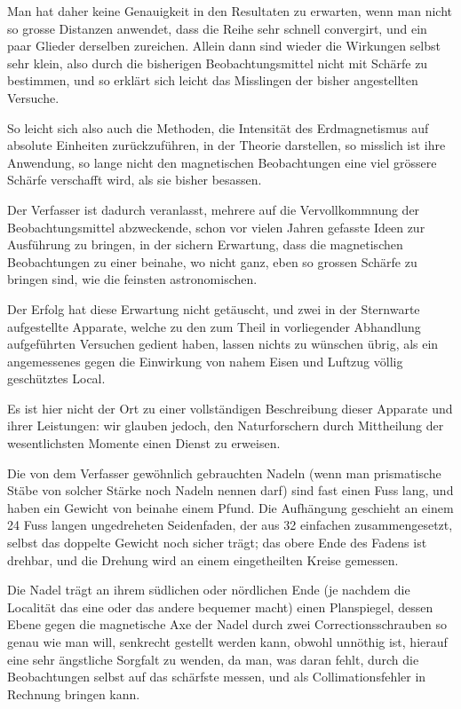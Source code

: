\documentclass[12pt,a4paper]{article}
\begin{document}
Man hat daher keine Genauigkeit in den Resultaten zu erwarten, wenn man nicht so grosse Distanzen anwendet, dass die Reihe sehr schnell convergirt, und ein paar Glieder derselben zureichen. Allein dann sind wieder die Wirkungen selbst sehr klein, also durch die bisherigen Beobachtungsmittel nicht mit Schärfe zu bestimmen, und so erklärt sich leicht das Misslingen der bisher angestellten Versuche.

So leicht sich also auch die Methoden, die Intensität des Erdmagnetismus auf absolute Einheiten zurückzuführen, in der Theorie darstellen, so misslich ist ihre Anwendung, so lange nicht den magnetischen Beobachtungen eine viel grössere Schärfe verschafft wird, als sie bisher besassen.

Der Verfasser ist dadurch veranlasst, mehrere auf die Vervollkommnung der Beobachtungsmittel abzweckende, schon vor vielen Jahren gefasste Ideen zur Ausführung zu bringen, in der sichern Erwartung, dass die magnetischen Beobachtungen zu einer beinahe, wo nicht ganz, eben so grossen Schärfe zu bringen sind, wie die feinsten astronomischen.

Der Erfolg hat diese Erwartung nicht getäuscht, und zwei in der Sternwarte aufgestellte Apparate, welche zu den zum Theil in vorliegender Abhandlung aufgeführten Versuchen gedient haben, lassen nichts zu wünschen übrig, als ein angemessenes gegen die Einwirkung von nahem Eisen und Luftzug völlig geschütztes Local.

Es ist hier nicht der Ort zu einer vollständigen Beschreibung dieser Apparate und ihrer Leistungen: wir glauben jedoch, den Naturforschern durch Mittheilung der wesentlichsten Momente einen Dienst zu erweisen.

Die von dem Verfasser gewöhnlich gebrauchten Nadeln (wenn man prismatische Stäbe von solcher Stärke noch Nadeln nennen darf) sind fast einen Fuss lang, und haben ein Gewicht von beinahe einem Pfund. Die Aufhängung geschieht an einem 24 Fuss langen ungedreheten Seidenfaden, der aus 32 einfachen zusammengesetzt, selbst das doppelte Gewicht noch sicher trägt; das obere Ende des Fadens ist drehbar, und die Drehung wird an einem eingetheilten Kreise gemessen.

Die Nadel trägt an ihrem südlichen oder nördlichen Ende (je nachdem die Localität das eine oder das andere bequemer macht) einen Planspiegel, dessen Ebene gegen die magnetische Axe der Nadel durch zwei Correctionsschrauben so genau wie man will, senkrecht gestellt werden kann, obwohl unnöthig ist, hierauf eine sehr ängstliche Sorgfalt zu wenden, da man, was daran fehlt, durch die Beobachtungen selbst auf das schärfste messen, und als Collimationsfehler in Rechnung bringen kann.
\end{document}

